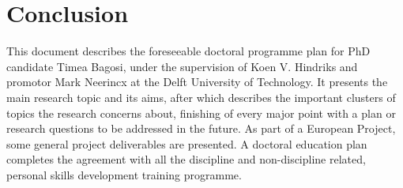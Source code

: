 \section{Conclusion}
This document describes the foreseeable doctoral programme plan for PhD
candidate Timea Bagosi, under the supervision of Koen V. Hindriks and
promotor Mark Neerincx at the Delft University of Technology. It presents
the main research topic and its aims, after which describes the important
clusters of topics the research concerns about, finishing of every major point
with a plan or research questions to be addressed in the future. As part
of a European Project, some general project deliverables are presented. A
doctoral education plan completes the agreement with all the discipline and
non-discipline related, personal skills development training programme.
    
  
  
  
  
  